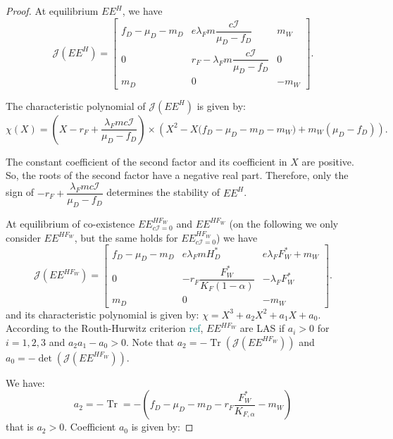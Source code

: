 \documentclass{article}
\newcommand{\lfw}{\lambda_{F}}
\newcommand{\lfw}{\lambda_{F}}
\newcommand{\marc}[1]{\textcolor{teal}{#1}}
\DeclareMathOperator{\Tr}{Tr}
\begin{document}
\begin{proof}
At equilibrium $EE^{H}$, we have
\begin{equation*}
\mathcal{J}(EE^{H}) = \begin{bmatrix}
f_D-\mu_D - m_D & e \lfw m \dfrac{c\mathcal{I}}{\mu_D - f_D} & m_W \\
0 & r_F - \lfw m \dfrac{c\mathcal{I}}{\mu_D - f_D} & 0 \\
m_D & 0 & -m_W
\end{bmatrix}.
\end{equation*}


The characteristic polynomial of $\mathcal{J}(EE^{H})$ is given by:
\begin{equation*}
\chi(X) = (X - r_F + \dfrac{\lfw m c\mathcal{I}}{\mu_D - f_D}) \times \left(X^2 - X\Big(f_D - \mu_D - m_D - m_W \Big) + m_W(\mu_D - f_D)\right).
\end{equation*}

The constant coefficient of the second factor and its coefficient in $X$ are positive. So, the roots of the second factor have a negative real part. Therefore, only the sign of $-r_F + \dfrac{\lfw m c\mathcal{I}}{\mu_D - f_D}$ determines the stability of $EE^{H}$.


\medskip
At equilibrium of co-existence $EE^{HF_W}_{c\mathcal{I} =0}$ and $EE^{HF_W}$ (on the following we only consider $EE^{HF_W}$, but the same holds for $EE^{HF_W}_{c\mathcal{I} =0}$) we have 
\begin{equation*}
\mathcal{J}(EE^{H F_W}) = \begin{bmatrix}
f_D -\mu_D - m_D & e \lfw m H_D^* & e \lfw F^*_W +m_W \\
0 & -r_F \dfrac{F_W^*}{K_F(1-\alpha)} & - \lfw F_W^* \\
m_D & 0 & -m_W
\end{bmatrix}.
\end{equation*} and its characteristic polynomial is given by: $\chi = X^3 + a_2 X^2 + a_1 X + a_0$. According to the Routh-Hurwitz criterion \marc{ref}, $EE^{H F_W}$ are LAS if $a_i > 0$ for $i=1,2,3$ and $a_2 a_1 - a_0 > 0$. Note that $a_2 = - \Tr(\mathcal{J}(EE^{H F_W}))$ and $a_0 = - \det (\mathcal{J}(EE^{H F_W}))$.

We have:
\begin{equation*}
a_2 = - \Tr = -(f_D - \mu_D - m_D - r_F \dfrac{F_W^*}{K_{F, \alpha}} - m_W)
\end{equation*}
that is $a_2>0$. Coefficient $a_0$ is given by:


\end{proof}
\end{document}
